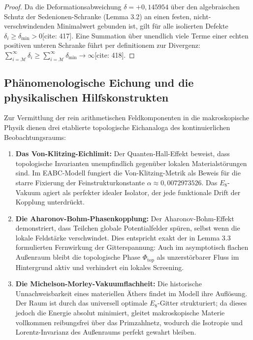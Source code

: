 \documentclass[11pt,a4paper]{article}
\theoremstyle{definition}
\begin{document}
	\begin{proof}
		Da die Deformationsabweichung $\delta = +0{,}145954$ über den algebraischen Schutz der Sedenionen-Schranke (Lemma 3.2) an einen festen, nicht-verschwindenden Minimalwert gebunden ist, gilt für alle isolierten Defekte $\delta_i \ge \delta_{\min} > 0$[cite: 417]. Eine Summation über unendlich viele Terme einer echten positiven unteren Schranke führt per definitionem zur Divergenz: $\sum_{i=\mathcal{M}}^{\infty} \delta_i \ge \sum_{i=\mathcal{M}}^{\infty} \delta_{\min} \rightarrow \infty$[cite: 418].
	\end{proof}
	
	\subsection{Phänomenologische Eichung und die physikalischen Hilfskonstrukten}
	Zur Vermittlung der rein arithmetischen Feldkomponenten in die makroskopische Physik dienen drei etablierte topologische Eichanaloga des kontinuierlichen Beobachtungsraums:
	\begin{enumerate}
		\item \textbf{Das Von-Klitzing-Eichlimit:} Der Quanten-Hall-Effekt beweist, dass topologische Invarianten unempfindlich gegenüber lokalen Materialstörungen sind. Im EABC-Modell fungiert die Von-Klitzing-Metrik als Beweis für die starre Fixierung der Feinstrukturkonstante $\alpha \approx 0{,}0072973526$. Das $E_8$-Vakuum agiert als perfekter idealer Isolator, der jede funktionale Drift der Kopplung unterdrückt.
		\item \textbf{Die Aharonov-Bohm-Phasenkopplung:} Der Aharonov-Bohm-Effekt demonstriert, dass Teilchen globale Potentialfelder spüren, selbst wenn die lokale Feldstärke verschwindet. Dies entspricht exakt der in Lemma 3.3 formulierten Fernwirkung der Gitterspannung: Auch im asymptotisch flachen Außenraum bleibt die topologische Phase $\Phi_{\text{top}}$ als unzerstörbarer Fluss im Hintergrund aktiv und verhindert ein lokales Screening.
		\item \textbf{Die Michelson-Morley-Vakuumflachheit:} Die historische Unnachweisbarkeit eines materiellen Äthers findet im Modell ihre Auflösung. Der Raum ist durch das universell optimale $E_8$-Gitter strukturiert; da dieses jedoch die Energie absolut minimiert, gleitet makroskopische Materie vollkommen reibungsfrei über das Primzahlnetz, wodurch die Isotropie und Lorentz-Invarianz des Außenraums perfekt gewahrt bleiben.
	\end{enumerate}
	
\end{document}
